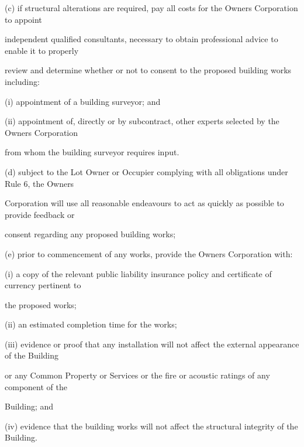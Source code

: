 \documentclass{article}
\begin{document}
{\fontsize{9.962}{1}(c) if structural alterations are required, pay all costs for the Owners Corporation to appoint }

{\fontsize{10.02}{1}independent qualified consultants, necessary to obtain professional advice to enable it to properly }

{\fontsize{10.02}{1}review and determine whether or not to consent to the proposed building works including: }

{\fontsize{9.962}{1}(i) appointment of a building surveyor; and }

{\fontsize{9.962}{1}(ii) appointment of, directly or by subcontract, other experts selected by the Owners Corporation }

{\fontsize{10.02}{1}from whom the building surveyor requires input. }

{\fontsize{9.962}{1}(d) subject to the Lot Owner or Occupier complying with all obligations under Rule 6, the Owners }

{\fontsize{10.02}{1}Corporation will use all reasonable endeavours to act as quickly as possible to provide feedback or }

{\fontsize{10.02}{1}consent regarding any proposed building works; }

{\fontsize{9.962}{1}(e) prior to commencement of any works, provide the Owners Corporation with: }

{\fontsize{9.962}{1}(i) a copy of the relevant public liability insurance policy and certificate of currency pertinent to }

{\fontsize{10.02}{1}the proposed works; }

{\fontsize{9.962}{1}(ii) an estimated completion time for the works; }

{\fontsize{9.962}{1}(iii) evidence or proof that any installation will not affect the external appearance of the Building }

{\fontsize{10.02}{1}or any Common Property or Services or the fire or acoustic ratings of any component of the }

\newpage


















{\fontsize{10.02}{1}Building; and }

{\fontsize{9.962}{1}(iv) evidence that the building works will not affect the structural integrity of the Building. }
\end{document}

